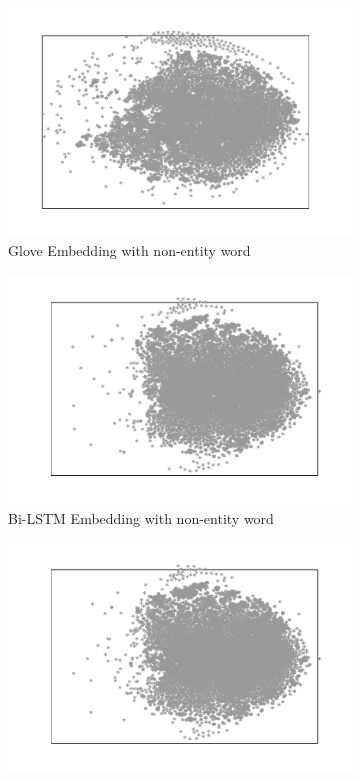 \documentclass{article}
\begin{document}
\begin{figure}[t]
	\begin{subfigure}[t]{0.24\textwidth}
		\includegraphics[width=\linewidth]{glove_embedding_negative_mirror.pdf}
		\caption{Glove Embedding with non-entity word}
		\label{fig:glove_negative}
	\end{subfigure} \hfil
   \begin{subfigure}[t]{0.24\textwidth}
	   \includegraphics[width=\linewidth]{bi_lstm_gold_negative.pdf}
	   \caption{Bi-LSTM Embedding with non-entity word}
	   \label{fig:bi_lstm_gold_negative}
   \end{subfigure} \hfil
	\begin{subfigure}[t]{0.24\textwidth}
		\includegraphics[width=\linewidth]{bi_lstm_mlp_negative.pdf}

\end{subfigure}
\end{figure}
\end{document}
